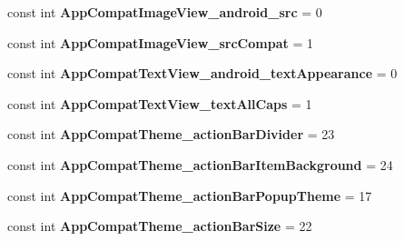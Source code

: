 \begin{DoxyCompactItemize}
const int {\bfseries App\+Compat\+Image\+View\+\_\+android\+\_\+src} = 0
\item 
\mbox{\label{class_sample_app_1_1_droid_1_1_resource_1_1_styleable_ad2fb039a9923400e37d0df670b00bac0}} 
const int {\bfseries App\+Compat\+Image\+View\+\_\+src\+Compat} = 1
\item 
\mbox{\label{class_sample_app_1_1_droid_1_1_resource_1_1_styleable_a108546a04e01d1be0e352a8550ff6ba6}} 
const int {\bfseries App\+Compat\+Text\+View\+\_\+android\+\_\+text\+Appearance} = 0
\item 
\mbox{\label{class_sample_app_1_1_droid_1_1_resource_1_1_styleable_aed64d078b516eeac6e260687b8b024f7}} 
const int {\bfseries App\+Compat\+Text\+View\+\_\+text\+All\+Caps} = 1
\item 
\mbox{\label{class_sample_app_1_1_droid_1_1_resource_1_1_styleable_aa7d742215ebfc205d965664dd64faf9d}} 
const int {\bfseries App\+Compat\+Theme\+\_\+action\+Bar\+Divider} = 23
\item 
\mbox{\label{class_sample_app_1_1_droid_1_1_resource_1_1_styleable_af83a3717c8a194c16d6e6fd98e3f12fa}} 
const int {\bfseries App\+Compat\+Theme\+\_\+action\+Bar\+Item\+Background} = 24
\item 
\mbox{\label{class_sample_app_1_1_droid_1_1_resource_1_1_styleable_afd335ca74c4c436b2949e22497f846ed}} 
const int {\bfseries App\+Compat\+Theme\+\_\+action\+Bar\+Popup\+Theme} = 17
\item 
\mbox{\label{class_sample_app_1_1_droid_1_1_resource_1_1_styleable_a84afe29d1fd7fbc45977a1eccc496c01}} 
const int {\bfseries App\+Compat\+Theme\+\_\+action\+Bar\+Size} = 22
\item 
\mbox{\label{class_sample_app_1_1_droid_1_1_resource_1_1_styleable_a2b343066451493b243c0ca0e94ce6f38}} 

\end{DoxyCompactItemize}
